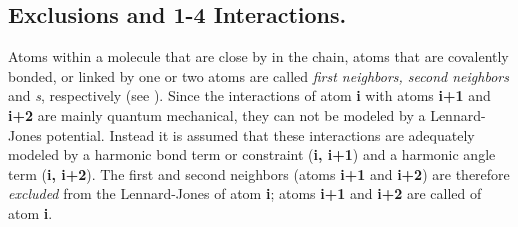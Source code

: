 \subsection{Exclusions and 1-4 Interactions.}
Atoms within a molecule that are close by in the chain, 
{\ie} atoms that are covalently bonded, or linked by one or two
atoms are called {\em first neighbors, second neighbors} and 
{\em {}s}, respectively (see ).  
Since the interactions of atom {\bf i} with atoms {\bf i+1} and {\bf i+2} 
are mainly quantum mechanical, they can not be modeled by a Lennard-Jones potential.
Instead it is assumed that these interactions are adequately modeled
by a harmonic bond term or constraint ({\bf i, i+1}) and a harmonic angle term
({\bf i, i+2}). The first and second neighbors (atoms {\bf i+1} and {\bf i+2}) 
are therefore
{\em excluded} from the Lennard-Jones  
of atom {\bf i};
atoms {\bf i+1} and {\bf i+2} are called {\em {}} of atom {\bf i}.

